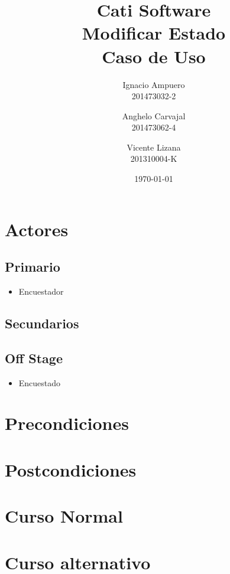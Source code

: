 \documentclass[fleqn]{article}
\title{\huge Cati Software\\ \Huge Modificar Estado\\ \Large Caso de Uso \vspace{30pt}}
\author{Ignacio Ampuero\\ 201473032-2 \and Anghelo Carvajal\\ 201473062-4 \and Vicente Lizana\\ 201310004-K}
\date{\today}
\begin{document}
\maketitle
\vspace{30pt}

\section{Actores}

	\subsection{Primario}
	
	\begin{itemize}
		\item Encuestador
	\end{itemize}		
	
	\subsection{Secundarios}
	
	\subsection{Off Stage}
	
	\begin{itemize}
		\item Encuestado
	\end{itemize}

\section{Precondiciones}

\section{Postcondiciones}

\section{Curso Normal}

\section{Curso alternativo}
\end{document}
